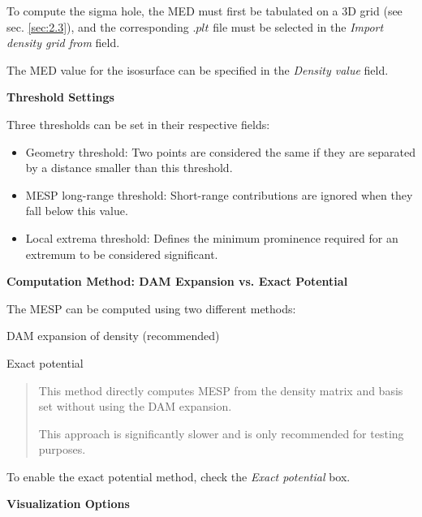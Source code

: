 \documentclass[10pt]{article}
\begin{document}
To compute the sigma hole, the MED must first be tabulated on a 3D grid (see sec. \ref{sec:2.3}),
and the corresponding $.plt$ file must be selected in the {\it Import density grid from} field.

The MED value for the isosurface can be specified in the {\it Density value} field.


\vspace*{3mm}
{\bf Threshold Settings}
\vspace*{3mm}

Three thresholds can be set in their respective fields:

\begin{itemize}
\item Geometry threshold: Two points are considered the same if they are separated
by a distance smaller than this threshold.
\item MESP long-range threshold: Short-range contributions are ignored
when they fall below this value.
\item Local extrema threshold: Defines the minimum prominence required
for an extremum to be considered significant.
\end{itemize}

\vspace*{3mm}
{\bf Computation Method: DAM Expansion vs. Exact Potential}
\vspace*{3mm}

The MESP can be computed using two different methods:

\begin{enumerate}
\item DAM expansion of density (recommended)
\item Exact potential
\vspace*{-5mm}
\begin{quote}
\item This method directly computes MESP from the density matrix and basis set
without using the DAM expansion.
\item This approach is significantly slower and is only recommended for testing purposes.
\end{quote}
\end{enumerate}

To enable the exact potential method, check the {\it Exact potential} box.

\vspace*{3mm}
{\bf Visualization Options}
\vspace*{3mm}
\end{document}
